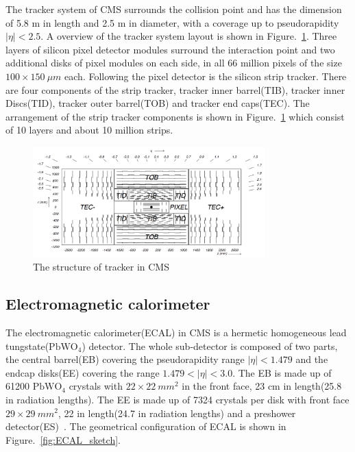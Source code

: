 The tracker system of CMS surrounds the collision point and has the dimension of 5.8 m in length and 2.5 m in diameter, with a coverage up to pseudorapidity $|\eta|<2.5$. A overview of the tracker system layout is shown in Figure.~\ref{fig:tracker_sketch}. Three layers of silicon pixel detector modules surround the interaction point and two additional disks of pixel modules on each side, in all 66 million pixels of the size $100\times150~ \mu m$ each. Following the pixel detector is the silicon strip tracker. There are four components of the strip tracker, tracker inner barrel(TIB), tracker inner Discs(TID), tracker outer barrel(TOB) and tracker end caps(TEC). The arrangement of the strip tracker components is shown in Figure.~\ref{fig:tracker_sketch} which consist of 10 layers and about 10 million strips. 


\begin{figure}[htbp] 
\centering
\includegraphics[width=0.8\textwidth]{chapter3/Tracker_structure.png}
\caption{The structure of tracker in CMS~\cite{CMS_experiment}}
\label{fig:tracker_sketch}
\end{figure}



\subsection{Electromagnetic calorimeter}

The electromagnetic calorimeter(ECAL) in CMS is a hermetic homogeneous lead tungstate($\textrm{PbWO}_{4}$) detector. The whole sub-detector is composed of two parts, the central barrel(EB) covering the pseudorapidity range $|\eta|<1.479$ and the endcap disks(EE) covering the range $1.479<|\eta|<3.0$. The EB is made up of 61200 $\textrm{PbWO}_{4}$ crystals with $22\times22~mm^{2}$ in the front face, 23 cm in length(25.8 in radiation lengths). The EE is made up of 7324 crystals per disk with front face $29\times29~mm^{2}$, 22 in length(24.7 in radiation lengths) and a preshower detector(ES)~\cite{CMS_TDR}. The geometrical configuration of ECAL is shown in Figure.~\ref{fig:ECAL_sketch}. 

